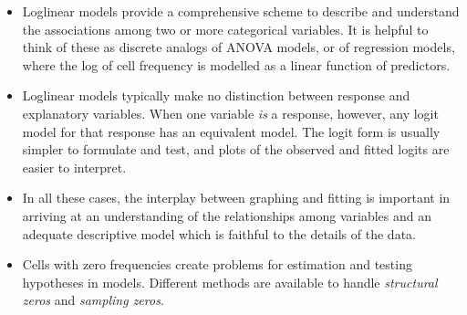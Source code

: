 \begin{itemize}
\item Loglinear models provide a comprehensive scheme to describe and
understand the associations among two or more categorical variables.
It is helpful to think of these as discrete analogs of ANOVA models,
or of regression models, where the log of cell frequency is modelled
as a linear function of predictors.


\item Loglinear models typically make no distinction between response
and explanatory variables.
When one variable \emph{is} a response, however, any logit model for
that response has an equivalent \loglin model.
The logit form is usually simpler to formulate and test, and plots of
the observed and fitted logits are easier to interpret.


\item In all these cases, the interplay between graphing and fitting is important in 
arriving at an understanding of the relationships among variables and
an adequate descriptive model which is faithful to the details of the
data.

\item Cells with zero frequencies create problems for estimation and testing
hypotheses in \loglin models.  Different methods are available to 
handle \emph{structural zeros} and \emph{sampling zeros}.



\end{itemize}

